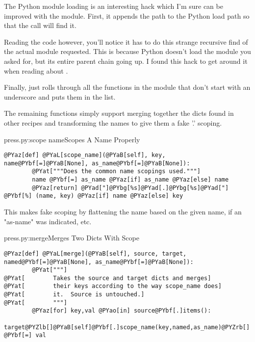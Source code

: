 The Python module loading is an interesting hack which I'm sure can be improved
with the  module.  First, it appends the 
path to the Python load path so that the  call will find it.

Reading the code however, you'll notice it has to do this strange recursive find
of the actual module requested.  This is because Python doesn't load the module
you asked for, but its entire parent chain going up.  I found this hack to get
around it when reading about .

Finally,  just rolls through all the functions in the module
that don't start with an underscore and puts them in the  list.

The remaining functions simply support merging together the dicts found in
other recipes and transforming the names to give them a fake '.' scoping.

\begin{code}{press.py:scope name}{Scopes A Name Properly}
\begin{Verbatim}[commandchars=@\[\]]
    @PYaz[def] @PYaL[scope_name](@PYaB[self], key, name@PYbf[=]@PYaB[None], as_name@PYbf[=]@PYaB[None]):
        @PYat["""Does the common name scopings used."""]
        name @PYbf[=] as_name @PYaz[if] as_name @PYaz[else] name
        @PYaz[return] @PYad["]@PYbg[%s]@PYad[.]@PYbg[%s]@PYad["] @PYbf[%] (name, key) @PYaz[if] name @PYaz[else] key
\end{Verbatim}

\end{code}

This makes fake scoping by flattening the name based on the given name, if an
"as-name" was indicated, etc.

\begin{code}{press.py:merge}{Merges Two Dicts With Scope}
\begin{Verbatim}[commandchars=@\[\]]
    @PYaz[def] @PYaL[merge](@PYaB[self], source, target, named@PYbf[=]@PYaB[None], as_name@PYbf[=]@PYaB[None]):
        @PYat["""]
@PYat[        Takes the source and target dicts and merges]
@PYat[        their keys according to the way scope_name does]
@PYat[        it.  Source is untouched.]
@PYat[        """]
        @PYaz[for] key,val @PYao[in] source@PYbf[.]items():
            target@PYZlb[]@PYaB[self]@PYbf[.]scope_name(key,named,as_name)@PYZrb[] @PYbf[=] val
\end{Verbatim}

\end{code}

